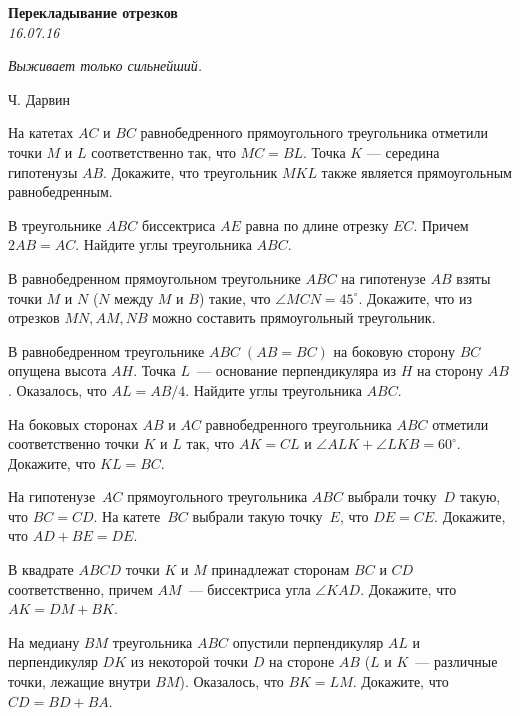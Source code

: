 \begin{center}
\textbf{\Large Перекладывание отрезков}\\
\textit{16.07.16}
\end{center}

\epigraph{\it Выживает только сильнейший.}{Ч. Дарвин}

\begin{problems}
\item На катетах $AC$ и $BC$ равнобедренного прямоугольного треугольника отметили точки $M$ и $L$ 
соответственно так, что $MC=BL$. Точка $K$ --- середина гипотенузы $AB$. Докажите, что треугольник 
$MKL$ также является прямоугольным равнобедренным. 

\item В треугольнике $ABC$ биссектриса $AE$ равна по длине отрезку $EC$. Причем $2AB=AC$. Найдите 
углы треугольника $ABC$.

\item В равнобедренном прямоугольном треугольнике $ABC$ на гипотенузе $AB$ взяты точки $M$ и $N$ ($N$ между $M$ и $B$) такие, что $\angle MCN=45^{\circ}$. Докажите, что из отрезков $MN, AM, NB$ можно составить прямоугольный треугольник.

\item В равнобедренном треугольнике $ABC\; (AB = BC)$ на боковую сторону $BC$ опущена высота $AH$. Точка $L$~--- основание перпендикуляра из $H$ на сторону $AB$. Оказалось, что $AL = AB/4$. Найдите углы треугольника $ABC$.

\item На боковых сторонах $AB$ и $AC$ равнобедренного треугольника $ABC$ отметили соответственно точки $K$ и $L$ так, что $AK = CL$ и $\angle ALK + \angle LKB = 60^{\circ}$. Докажите, что $KL = BC$.

\item На гипотенузе~$AC$ прямоугольного треугольника $ABC$ выбрали точку~$D$ такую, что $BC=CD$. На катете~$BC$ выбрали такую точку~$E$, что $DE=CE$. Докажите, что $AD+BE=DE$. 

\item В квадрате $ABCD$ точки $K$ и $M$ принадлежат сторонам $BC$ и $CD$  соответственно, причем $AM$~--- биссектриса угла $\angle KAD$. Докажите, что $AK=DM+BK$.


\item На медиану $BM$ треугольника $ABC$ опустили перпендикуляр $AL$ и перпендикуляр $DK$ из некоторой точки $D$ на стороне $AB$ ($L$ и $K$~--- различные точки, лежащие внутри $BM$). Оказалось, что $BK = LM$. Докажите, что $CD = BD+BA$.

\end{problems}